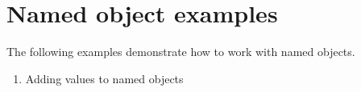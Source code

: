 \documentclass[letterpaper,12pt,english,openany,oneside]{sphinxmanual}
\begin{document}
\section{Named object examples}
\label{\detokenize{pdfmark_Examples:named-object-examples}}
The following examples demonstrate how to work with named objects.


\begin{sphinxVerbatim}[commandchars=\\\{\}]
\PYG{p}{[}         
\PYG{p}{[}      
\PYG{p}{[}      
\end{sphinxVerbatim}
\begin{enumerate}
%
\item {} 
Adding values to named objects

\end{enumerate}
\end{document}
